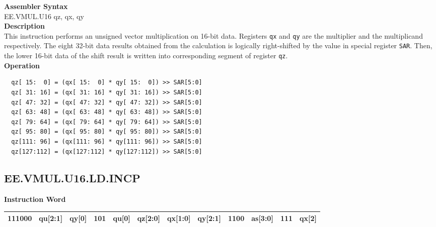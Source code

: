 \textbf{Assembler Syntax} \\
EE.VMUL.U16 qz, qx, qy \\
\textbf{Description} \\
This instruction performs an unsigned vector multiplication on 16-bit data. Registers \lstinline{qx} and \lstinline{qy} are the multiplier and the multiplicand respectively. The eight 32-bit data results obtained from the calculation is logically right-shifted by the value in special register \lstinline{SAR}. Then, the lower 16-bit data of the shift result is written into corresponding segment of register \lstinline{qz}.\\
\textbf{Operation}
\begin{lstlisting}
  qz[ 15:  0] = (qx[ 15:  0] * qy[ 15:  0]) >> SAR[5:0]
  qz[ 31: 16] = (qx[ 31: 16] * qy[ 31: 16]) >> SAR[5:0]
  qz[ 47: 32] = (qx[ 47: 32] * qy[ 47: 32]) >> SAR[5:0]
  qz[ 63: 48] = (qx[ 63: 48] * qy[ 63: 48]) >> SAR[5:0]
  qz[ 79: 64] = (qx[ 79: 64] * qy[ 79: 64]) >> SAR[5:0]
  qz[ 95: 80] = (qx[ 95: 80] * qy[ 95: 80]) >> SAR[5:0]
  qz[111: 96] = (qx[111: 96] * qy[111: 96]) >> SAR[5:0]
  qz[127:112] = (qx[127:112] * qy[127:112]) >> SAR[5:0]
\end{lstlisting}

\clearpage
\subsection{EE.VMUL.U16.LD.INCP}\label{instruction:EEVMULU16LDINCP}
\setlength\tabcolsep{6pt}
\textbf{Instruction Word} \\
\begin{tabular}{|c|c|c|c|c|c|c|c|c|c|c|c|}
	\hline
	111000 & qu[2:1] & qy[0] & 101 & qu[0] & qz[2:0] & qx[1:0] & qy[2:1] & 1100 & as[3:0] & 111 & qx[2] \\
	\hline
\end{tabular}

